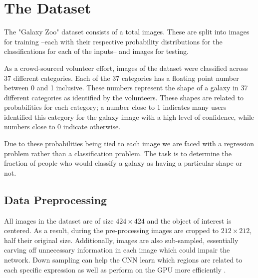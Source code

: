\section{The Dataset}

The "Galaxy Zoo" dataset consists of a total  images. These are split into  images for training --each with their respective probability distributions for the classifications for each of the inputs-- and  images for testing.

As a crowd-sourced volunteer effort, images of the dataset were classified across 37 different categories. Each of the 37 categories has a floating point number between 0 and 1 inclusive. These numbers represent the shape of a galaxy in 37 different categories as identified by the volunteers. These shapes are related to probabilities for each category; a number close to 1 indicates many users identified this category for the galaxy image with a high level of confidence, while numbers close to 0 indicate otherwise.

Due to these probabilities being tied to each image we are faced with a regression problem rather than a classification problem. The task is to determine the fraction of people who would classify a galaxy as having a particular shape or not.

\subsection{Data Preprocessing}

All images in the dataset are of size $424 \times 424$ and the object of interest is centered. As a result, during the pre-processing images are cropped to $212 \times 212$, half their original size. Additionally, images are also sub-sampled, essentially carving off unnecessary information in each image which could impair the network. Down sampling can help the CNN learn which regions are related to each specific expression as well as perform on the GPU more efficiently \cite{deep-learning-review}.
